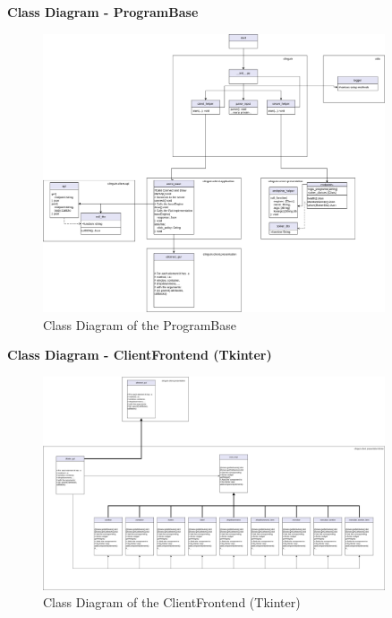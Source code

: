 \documentclass[12pt,a4paper]{article}
\newcommand{\<}[1]{\guilsinglleft}
\renewcommand{\>}[1]{\guilsinglright}
\begin{document}
\newpage

\noindent \textbf{Class Diagram - ProgramBase}

\begin{figure}[ht]
    \begin{center}
    \includegraphics[width=0.9\textwidth]{imgs/pt-v3-class-diag-program-base.png}
    \caption{Class Diagram of the ProgramBase}
    \label{fig:pt-v3-class-diag-program-base}
    \end{center}
\end{figure}

\newpage

\noindent \textbf{Class Diagram - ClientFrontend (Tkinter)}

\begin{figure}[ht]
    \begin{center}
    \includegraphics[width=0.9\textwidth]{imgs/pt-v3-class-diag-tkinter-client.png}
    \caption{Class Diagram of the ClientFrontend (Tkinter)}
    \label{fig:pt-v3-class-diag-tkinter}
    \end{center}
\end{figure}
\end{document}
